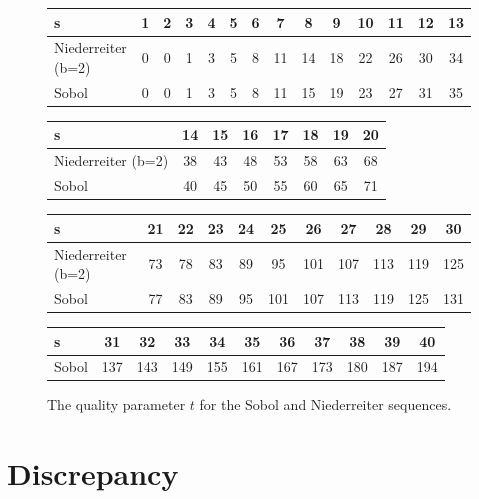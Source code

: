 \begin{figure}
\begin{center}
\begin{tabular}{l|ccccccccccccc}
      s                  & 1 & 2 & 3 & 4 & 5 & 6 &  7 &  8 &  9 & 10 & 11 & 12 & 13 \\
	  \hline
      Niederreiter (b=2) & 0 & 0 & 1 & 3 & 5 & 8 & 11 & 14 & 18 & 22 & 26 & 30 & 34 \\
      Sobol              & 0 & 0 & 1 & 3 & 5 & 8 & 11 & 15 & 19 & 23 & 27 & 31 & 35 \\
\end{tabular}

\begin{tabular}{l|ccccccc}
      s                  & 14 & 15 & 16 & 17 & 18 & 19 & 20 \\
	  \hline
      Niederreiter (b=2) & 38 & 43 & 48 & 53 & 58 & 63 & 68 \\
      Sobol              & 40 & 45 & 50 & 55 & 60 & 65 & 71 \\
\end{tabular}

\begin{tabular}{l|cccccccccc}
      s                  & 21 & 22 & 23 & 24 &  25 &  26 &  27 &  28 &  29 &  30 \\
	  \hline
      Niederreiter (b=2) & 73 & 78 & 83 & 89 &  95 & 101 & 107 & 113 & 119 & 125 \\
      Sobol              & 77 & 83 & 89 & 95 & 101 & 107 & 113 & 119 & 125 & 131 \\
\end{tabular}

\begin{tabular}{l|cccccccccc}
      s     &  31 &  32 &  33 &  34 &  35 &  36 &  37 &  38 &  39 &  40 \\
	  \hline
      Sobol & 137 & 143 & 149 & 155 & 161 & 167 & 173 & 180 & 187 & 194 \\
\end{tabular}
\end{center}
\caption{The quality parameter $t$ for the Sobol and Niederreiter sequences.}
\label{fig-tparameter-sobolnied}
\end{figure}


\section{Discrepancy}
    
